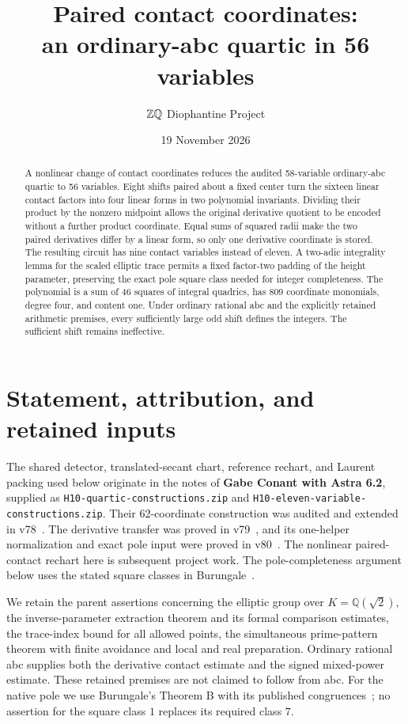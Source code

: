 \documentclass[11pt,a4paper]{article}
\title{Paired contact coordinates:\\an ordinary-abc quartic in 56 variables}
\author{\(\Z\Q\) Diophantine Project}
\date{19 November 2026}
\newcommand{\Q}{\mathbb Q}\newcommand{\Z}{\mathbb Z}
\begin{document}
\maketitle
\begin{abstract}
A nonlinear change of contact coordinates reduces the audited
58-variable ordinary-abc quartic to 56 variables. Eight shifts paired
about a fixed center turn the sixteen linear contact factors into four
linear forms in two polynomial invariants. Dividing their product by the
nonzero midpoint allows the original derivative quotient to be encoded
without a further product coordinate. Equal sums of squared radii make
the two paired derivatives differ by a linear form, so only one derivative
coordinate is stored. The resulting circuit has nine contact variables instead of eleven.
A two-adic integrality lemma for the scaled elliptic trace permits a
fixed factor-two padding of the height parameter, preserving the exact
pole square class needed for integer completeness. The polynomial is
a sum of 46 squares of integral quadrics, has 809 coordinate monomials,
degree four, and content one. Under ordinary rational abc and the
explicitly retained arithmetic premises, every sufficiently large odd
shift defines the integers. The sufficient shift remains ineffective.
\end{abstract}

\section{Statement, attribution, and retained inputs}

The shared detector, translated-secant chart, reference rechart, and
Laurent packing used below originate in the notes of \textbf{Gabe Conant
with Astra 6.2}, supplied as \texttt{H10-quartic-constructions.zip} and
\texttt{H10-eleven-variable-constructions.zip}. Their 62-coordinate
construction was audited and extended in v78~\cite{Conant,v78}.
The derivative transfer was proved in v79~\cite{v79}, and its one-helper
normalization and exact pole input were proved in v80~\cite{v80}. The
nonlinear paired-contact rechart here is subsequent project work. The
pole-completeness argument below uses the stated square classes in
Burungale~\cite[Theorem B]{Burungale}.

We retain the parent assertions concerning the elliptic group over
$K=\Q(\sqrt2)$, the inverse-parameter extraction theorem and its formal
comparison estimates, the trace-index bound for all allowed points, the
simultaneous prime-pattern theorem with finite avoidance and local and
real preparation. Ordinary rational abc supplies both the derivative
contact estimate and the signed mixed-power estimate. These retained
premises are not claimed to follow from abc. For the native pole we use
Burungale's Theorem B with its published congruences~\cite{Burungale};
no assertion for the square class $1$ replaces its required class $7$.
\end{document}
